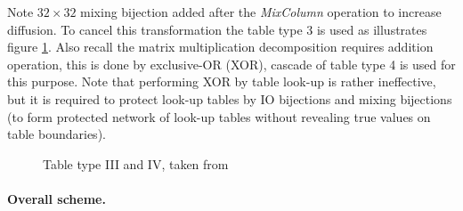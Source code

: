 \documentclass[11pt,oneside,final]{fithesis2}
\begin{document}
    Note $32\times32$ mixing bijection added after the \emph{MixColumn} operation to increase diffusion. To cancel this transformation the table 
    type 3 is used as illustrates figure \ref{fig:aes_t3_t4}. Also recall the matrix multiplication decomposition requires addition operation, this is done
    by exclusive-OR (XOR), cascade of table type 4 is used for this purpose. Note that performing XOR by table look-up is rather ineffective, but it is required to 
    protect look-up tables by IO bijections and mixing bijections (to form protected network of look-up tables without revealing true values on 
    table boundaries).
    
    \begin{figure}[!htb]
    \begin{center}
    \leavevmode
    \centerline{}
    \end{center}
    \caption{Table type III and IV, taken from~\citep{wyseurPhd}}
    \label{fig:aes_t3_t4}
    \end{figure}
        

    \paragraph*{Overall scheme.}
    
\end{document}
